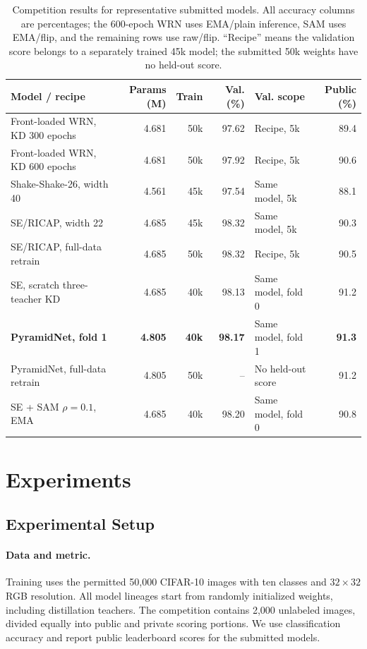 \documentclass[letterpaper]{article} %
\begin{document}
\begin{table}[t]
\centering\small
\begin{tabular}{lrrrlr}
\toprule
Model / recipe & Params (M) & Train & Val. (\%) & Val. scope & Public (\%)\\
\midrule
Front-loaded WRN, KD 300 epochs & 4.681 & 50k & 97.62 & Recipe, 5k & 89.4\\
Front-loaded WRN, KD 600 epochs & 4.681 & 50k & 97.92 & Recipe, 5k & 90.6\\
Shake-Shake-26, width 40 & 4.561 & 45k & 97.54 & Same model, 5k & 88.1\\
SE/RICAP, width 22 & 4.685 & 45k & 98.32 & Same model, 5k & 90.3\\
SE/RICAP, full-data retrain & 4.685 & 50k & 98.32 & Recipe, 5k & 90.5\\
SE, scratch three-teacher KD & 4.685 & 40k & 98.13 & Same model, fold 0 & 91.2\\
\textbf{PyramidNet, fold 1} & \textbf{4.805} & \textbf{40k} & \textbf{98.17} & Same model, fold 1 & \textbf{91.3}\\
PyramidNet, full-data retrain & 4.805 & 50k & -- & No held-out score & 91.2\\
SE + SAM $\rho=0.1$, EMA & 4.685 & 40k & 98.20 & Same model, fold 0 & 90.8\\
\bottomrule
\end{tabular}
\caption{Competition results for representative submitted models. All accuracy columns are percentages; the 600-epoch WRN uses EMA/plain inference, SAM uses EMA/flip, and the remaining rows use raw/flip. ``Recipe'' means the validation score belongs to a separately trained 45k model; the submitted 50k weights have no held-out score.}
\label{tab:submissions}
\end{table}

\section{Experiments}
\subsection{Experimental Setup}
\paragraph{Data and metric.}
Training uses the permitted 50,000 CIFAR-10 images with ten classes and $32\times32$ RGB resolution. All model lineages start from randomly initialized weights, including distillation teachers. The competition contains 2,000 unlabeled images, divided equally into public and private scoring portions. We use classification accuracy and report public leaderboard scores for the submitted models.
\end{document}

